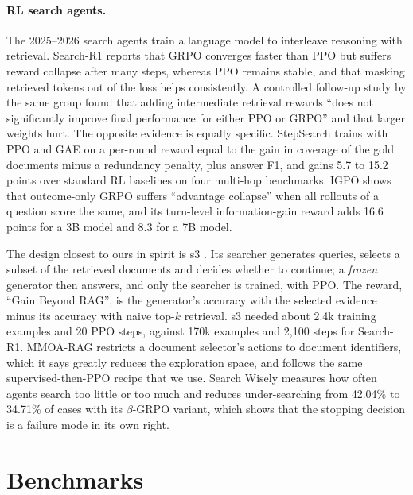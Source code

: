 \paragraph{RL search agents.} The 2025--2026 search agents train a language model to interleave reasoning with retrieval. Search-R1 \citep{jin2025searchr1} reports that GRPO converges faster than PPO but suffers reward collapse after many steps, whereas PPO remains stable, and that masking retrieved tokens out of the loss helps consistently. A controlled follow-up study by the same group \citep{jin2025empirical} found that adding intermediate retrieval rewards ``does not significantly improve final performance for either PPO or GRPO'' and that larger weights hurt. The opposite evidence is equally specific. StepSearch \citep{wang2025stepsearch} trains with PPO and GAE on a per-round reward equal to the gain in coverage of the gold documents minus a redundancy penalty, plus answer F1, and gains 5.7 to 15.2 points over standard RL baselines on four multi-hop benchmarks. IGPO \citep{wang2026igpo} shows that outcome-only GRPO suffers ``advantage collapse'' when all rollouts of a question score the same, and its turn-level information-gain reward adds 16.6 points for a 3B model and 8.3 for a 7B model.

The design closest to ours in spirit is s3 \citep{jiang2025s3}. Its searcher generates queries, selects a subset of the retrieved documents and decides whether to continue; a \emph{frozen} generator then answers, and only the searcher is trained, with PPO. The reward, ``Gain Beyond RAG'', is the generator's accuracy with the selected evidence minus its accuracy with naive top-$k$ retrieval. s3 needed about 2.4k training examples and 20 PPO steps, against 170k examples and 2{,}100 steps for Search-R1. MMOA-RAG \citep{chen2025mmoarag} restricts a document selector's actions to document identifiers, which it says greatly reduces the exploration space, and follows the same supervised-then-PPO recipe that we use. Search Wisely \citep{wu2025searchwisely} measures how often agents search too little or too much and reduces under-searching from 42.04\% to 34.71\% of cases with its $\beta$-GRPO variant, which shows that the stopping decision is a failure mode in its own right.

\section{Benchmarks}
\label{sec:lit-data}

